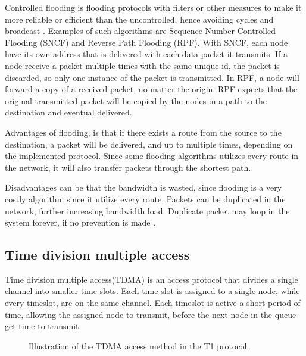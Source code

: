 Controlled flooding is flooding protocols with filters or other measures to make it more reliable or efficient than the uncontrolled, hence avoiding cycles and broadcast \cite{controlled_flooding}.
Examples of such algorithms are Sequence Number Controlled Flooding (SNCF) and Reverse Path Flooding (RPF).
With SNCF, each node have its own address that is delivered with each data packet it transmits.
If a node receive a packet multiple times with the same unique id, the packet is discarded, so only one instance of the packet is transmitted.
In RPF, a node will forward a copy of a received packet, no matter the origin.
RPF expects that the original transmitted packet will be copied by the nodes in a path to the destination and eventual delivered\cite{RPF}.

Advantages of flooding, is that if there exists a route from the source to the destination, a packet will be delivered, and up to multiple times, depending on the implemented protocol.
Since some flooding algorithms utilizes every route in the network, it will also transfer packets through the shortest path\cite{flooding}.

Disadvantages can be that the bandwidth is wasted, since flooding is a very costly algorithm since it utilize every route.
Packets can be duplicated in the network, further increasing bandwidth load.
Duplicate packet may loop in the system forever, if no prevention is made \cite{flooding}.


\subsection{Time division multiple access}
Time division multiple access(TDMA) is an access protocol that divides a single channel into smaller time slots.
Each time slot is assigned to a single node, while every timeslot, are on the same channel.
Each timeslot is active a short period of time, allowing the assigned node to transmit, before the next node in the queue get time to transmit\cite{TDMA}.

\begin{figure}[!h]
	\centering
	\caption{Illustration of the TDMA access method in the T1 protocol\cite{TDMA}.}
	\label{fig:TDMAfigure}
\end{figure}

